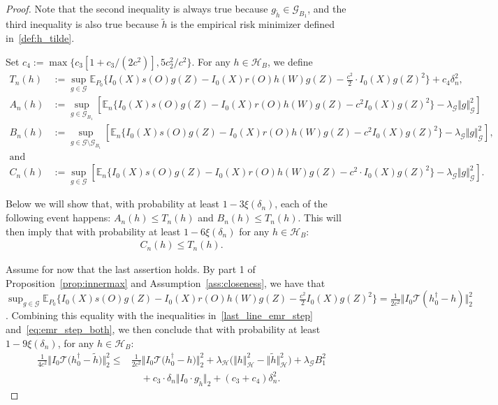 \documentclass[twoside,11pt]{article}
\newcommand{\E}{\mathbb{E}}
\newcommand{\mc}{\mathcal}
\begin{document}
\begin{proof}
Note that the second inequality is always true because $g_{\tilde h}\in \mc{G}_{B_1}$, and the third inequality is also true because $\tilde h$ is the empirical risk minimizer defined in~\eqref{def:h_tilde}.

Set $c_4:=\max\{c_3[1+c_3/(2c^2)], 5c_2^2/c^2\}$. For any $h\in\mc{H}_B$, we define
\begin{align*}
    T_n(h)&:=\sup_{g\in\mc{G}}\E_{P_0}\big\{I_0(X)s(O)g(Z)-I_0(X)r(O)h(W) g(Z)-\frac{c^2}{2}\cdot I_0(X) g(Z)^2\big\}+c_4\delta_n^2,\\
    A_n(h)&:=\sup_{g\in\mc{G}_{B_1}}\left[\E_n\big\{I_0(X)s(O)g(Z)-I_0(X)r(O)h(W)g(Z)-c^2 I_0(X)g(Z)^2\big\}-\lambda_{\mathcal{G}}\Vert g\Vert_{\mathcal{G}}^2\right]\\
    B_n(h)&:=\sup_{g\in\mc{G}\setminus\mc{G}_{B_1}}\left[\E_n\big\{I_0(X)s(O)g(Z)-I_0(X)r(O)h(W)g(Z)-c^2 I_0(X)g(Z)^2\big\}-\lambda_{\mathcal{G}}\Vert g\Vert_{\mathcal{G}}^2\right],\\
    \text{and}\quad&\\
    C_n(h)&:= \sup_{g\in\mc{G}}\left[\E_n\big\{I_0(X)s(O)g(Z)-I_0(X)r(O)h(W)g(Z)-c^2\cdot I_0(X)g(Z)^2\big\}-\lambda_{\mathcal{G}}\Vert g\Vert_{\mathcal{G}}^2\right].
\end{align*}

Below we will show that, with probability at least $1-3\xi(\delta_n)$, each of the following event happens: $A_n(h)\le T_n(h)$ and $B_n(h)\le T_n(h)$. This will then imply that with probability at least $1-6\xi(\delta_n)$ for any $h\in\mc{H}_B$: 
\begin{align}
   C_n(h)\le T_n(h).\label{eq:emr_step_both}
\end{align}

Assume for now that the last assertion holds. By part 1 of Proposition~\ref{prop:innermax} and Assumption~\ref{ass:closeness}, we have that $\sup_{g\in\mc{G}}\E_{P_0}\{I_0(X)s(O)g(Z)-I_0(X)r(O)h(W)g(Z)-\frac{c^2}{2} I_0(X)g(Z)^2\}=\frac{1}{2c^2}\Vert I_0\mc{T}(h_0^\dag-h)\Vert^2_2$. Combining this equality with the inequalities in~\eqref{last_line_emr_step} and~\eqref{eq:emr_step_both}, we then conclude that with probability at least $1-9\xi(\delta_n)$, for any $h\in\mc{H}_B$:
\begin{align}
    \frac{1}{4c^2}\big\Vert I_0\mc{T}\big(h_0^\dag-\tilde h \big)\big\Vert^2_2\le&  \frac{1}{2c^2}\big\Vert I_0\mc{T}\big(h_0^\dag-h\big)\big\Vert^2_2+\lambda_{\mc{H}}\Big(\big\Vert h\big\Vert_{\mc{H}}^2-\big\Vert \tilde h\big\Vert_{\mc{H}}^2\Big)+\lambda_{\mc{G}}B_1^2\nonumber \\
    &\quad+c_3\cdot\delta_n\Vert  I_0\cdot g_{\tilde h}\Vert_2 +\left(c_3+c_4\right)\delta_n^2\label{ineq_aux}.
\end{align}


\end{proof}
\end{document}
